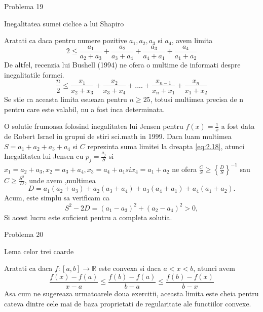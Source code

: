 \documentclass[a4paper,12pt,oneside]{report}
\begin{document}
Problema 19 

Inegalitatea sumei ciclice a lui Shapiro

Aratati ca daca pentru numere pozitive
 \(a_{1} , a_{2} , a_{3}\)  si \(  a_{4}\), avem limita
 \begin{displaymath}
     2\leq \frac{a_{1}}{a_{2} + a_{3}} + \frac{a_{2}}{a_{3} + a_{4}} + \frac{a_{3}}{a_{4} + a_{1}} + \frac{a_{4}}{a_{1} + a_{2}} \label{eq:2.20} \tag{2.20}
 \end{displaymath}
De altfel, recenzia lui Bushell (1994) ne ofera o multime de informati despre inegalitatile formei.
\begin{displaymath}
    \frac{n}{2} \leq \frac{x_{1}}{x_{2} + x_{3}} + \frac{x_{2}}{x_{3} + x_{4}} + ....+ \frac{x_{n - 1}}{x_{n} + x_{1}} + \frac{x_{n}}{x_{1} + x_{2}}
\end{displaymath}
Se stie ca aceasta limita esueaza pentru  \(n\geq 25\), totusi multimea precisa de n pentru care este valabil, nu a fost inca determinata. 

O solutie frumoasa folosind inegalitatea lui Jensen pentru \(f\left ( x \right ) = \frac{1}{x}\) a fost data de Robert Israel in grupui de stiri sci.math in 1999. Daca luam multimea \(S = a_{1} + a_{2} + a_{3} + a_{4}\) si \(C\) reprezinta suma limitei la dreapta \ref{eq:2.18}, atunci Inegalitatea lui Jensen cu \(p_{j} = \frac{a_{j}}{S}\) si \(x_{1} = a_{2} + a_{3}, x_{2} = a_{3} + a_{4} , x_{3} = a_{4} + a_{1} si x_{4} = a_{1} + a_{2}\) ne ofera \(\frac{C}{S} \geq \left \{ \frac{D}{S} \right \}^{-1}\) sau \(C \geq \frac{S^{2}}{D}\), unde avem ,multimea 
\begin{displaymath}
    D = a_{1}\left ( a_{2} + a_{3} \right ) + a_{2}\left ( a_{3} + a_{4} \right ) + a_{3}\left ( a_{4} + a_{1} \right ) + a_{4}\left ( a_{1} + a_{2} \right ).
\end{displaymath}
Acum, este simplu sa verificam ca 
\begin{displaymath}
    S^{2} - 2D = \left ( a_{1} - a_{3} \right )^{2} + \left ( a_{2} - a_{4} \right )^{2}> 0, 
\end{displaymath}
Si acest lucru este suficient pentru a completa solutia. 


Problema 20 
	
Lema celor trei coarde 

Aratati ca daca \(f : \left [ a,b \right ]  \to \mathbb{R}\) este convexa si daca \(a <  x < b\), atunci avem
\begin{displaymath}
    \frac{f\left ( x \right ) - f\left ( a \right )}{x - a} \leq \frac{f\left ( b \right ) - f\left ( a \right )}{b - a} \leq  \frac{f\left ( b \right ) - f\left ( x \right )}{b - x}   \label{eq:2.21}\tag{2.21}
\end{displaymath}
Asa cum ne sugereaza urmatoarele doua exercitii, aceasta limita este cheia pentru cateva dintre cele mai de baza proprietati de regularitate ale functiilor convexe. 
\end{document}
